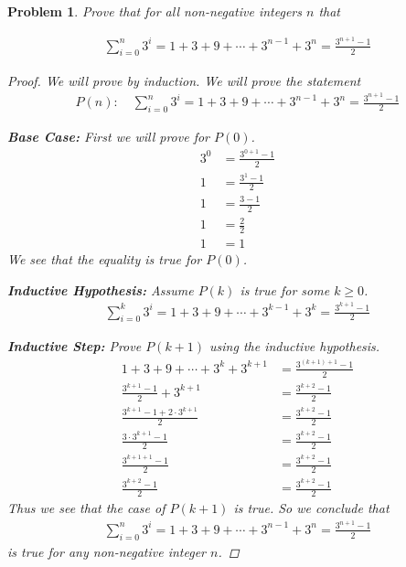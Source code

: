\documentclass{article}
\theoremstyle{problemstyle}
\newtheorem{problem}{Problem}
\begin{document}
\begin{problem}
   
Prove that for all non-negative integers $n$ that

\begin{align*}
  \sum_{i=0}^{n}3^i = 1+3+9+\cdots+3^{n-1}+3^n=\frac{3^{n+1}-1}{2}
\end{align*}

\begin{proof}
  We will prove by induction. We will prove the statement
  \begin{align*}
    P(n):\quad \sum_{i=0}^{n}3^i = 1+3+9+\cdots+3^{n-1}+3^n=\frac{3^{n+1}-1}{2}
  \end{align*}

  \textbf{Base Case:} First we will prove for $P(0)$.
  \begin{align*}
    3^0 &= \frac{3^{0+1}-1}{2}\\
    1 &= \frac{3^1-1}{2}\\
    1 &= \frac{3-1}{2}\\
    1 &= \frac{2}{2}\\
    1 &= 1
  \end{align*}
  We see that the equality is true for $P(0)$.

  \textbf{Inductive Hypothesis:} Assume $P(k)$ is true for some $k\ge0$.
  \begin{align*}
    \sum_{i=0}^{k}3^i = 1+3+9+\cdots+3^{k-1}+3^k=\frac{3^{k+1}-1}{2}
  \end{align*}

  \textbf{Inductive Step:} Prove $P(k+1)$ using the \textit{inductive
  hypothesis}.
  \begin{align*}
    1+3+9+\cdots+3^k+3^{k+1} &= \frac{3^{(k+1)+1}-1}{2}\\
    \frac{3^{k+1}-1}{2}+3^{k+1} &= \frac{3^{k+2}-1}{2}\\
    \frac{3^{k+1}-1+2\cdot3^{k+1}}{2} &= \frac{3^{k+2}-1}{2}\\
    \frac{3\cdot3^{k+1}-1}{2} &= \frac{3^{k+2}-1}{2}\\
    \frac{3^{k+1+1}-1}{2} &= \frac{3^{k+2}-1}{2}\\
    \frac{3^{k+2}-1}{2} &= \frac{3^{k+2}-1}{2}
  \end{align*}
  Thus we see that the case of $P(k+1)$ is true. So we conclude that
  \begin{align*}
    \sum_{i=0}^{n}3^i = 1+3+9+\cdots+3^{n-1}+3^n=\frac{3^{n+1}-1}{2}
  \end{align*}
  is true for any non-negative integer $n$.
\end{proof}
\end{problem}
\end{document}
